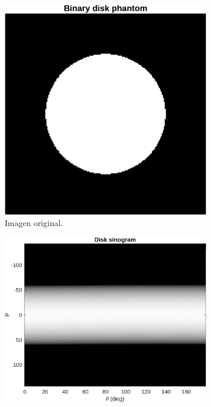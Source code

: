 \documentclass[11pt]{article}
\begin{document}
\begin{figure}[H]
\centering
\begin{subfigure}[b]{0.30\textwidth}
  \includegraphics[width=\linewidth]{figures/disk_original.png}
  \caption{Imagen original.}
\end{subfigure}\hfill
\begin{subfigure}[b]{0.34\textwidth}
  \includegraphics[width=\linewidth]{figures/disk_sinogram.png}

\end{subfigure}
\end{figure}
\end{document}
